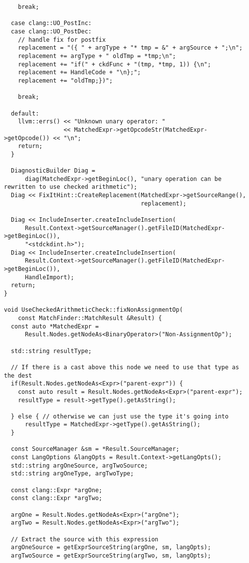 {\begin{verbatim}
    break;

  case clang::UO_PostInc:
  case clang::UO_PostDec:
    // handle fix for postfix
    replacement = "({ " + argType + "* tmp = &" + argSource + ";\n";
    replacement += argType + " oldTmp = *tmp;\n";
    replacement += "if(" + ckdFunc + "(tmp, *tmp, 1)) {\n";
    replacement += HandleCode + "\n};";
    replacement += "oldTmp;})";

    break;

  default:
    llvm::errs() << "Unknown unary operator: "
                 << MatchedExpr->getOpcodeStr(MatchedExpr->getOpcode()) << "\n";
    return;
  }

  DiagnosticBuilder Diag =
      diag(MatchedExpr->getBeginLoc(), "unary operation can be rewritten to use checked arithmetic");
  Diag << FixItHint::CreateReplacement(MatchedExpr->getSourceRange(),
                                       replacement);

  Diag << IncludeInserter.createIncludeInsertion(
      Result.Context->getSourceManager().getFileID(MatchedExpr->getBeginLoc()),
      "<stdckdint.h>");
  Diag << IncludeInserter.createIncludeInsertion(
      Result.Context->getSourceManager().getFileID(MatchedExpr->getBeginLoc()),
      HandleImport);
  return;
}

void UseCheckedArithmeticCheck::fixNonAssignmentOp(
    const MatchFinder::MatchResult &Result) {
  const auto *MatchedExpr =
      Result.Nodes.getNodeAs<BinaryOperator>("Non-AssignmentOp");

  std::string resultType;

  // If there is a cast above this node we need to use that type as the dest
  if(Result.Nodes.getNodeAs<Expr>("parent-expr")) {
    const auto result = Result.Nodes.getNodeAs<Expr>("parent-expr");
    resultType = result->getType().getAsString();

  } else { // otherwise we can just use the type it's going into
      resultType = MatchedExpr->getType().getAsString();
  }

  const SourceManager &sm = *Result.SourceManager;
  const LangOptions &langOpts = Result.Context->getLangOpts();
  std::string argOneSource, argTwoSource;
  std::string argOneType, argTwoType;

  const clang::Expr *argOne;
  const clang::Expr *argTwo;

  argOne = Result.Nodes.getNodeAs<Expr>("argOne");
  argTwo = Result.Nodes.getNodeAs<Expr>("argTwo");

  // Extract the source with this expression
  argOneSource = getExprSourceString(argOne, sm, langOpts);
  argTwoSource = getExprSourceString(argTwo, sm, langOpts);


\end{verbatim}}
